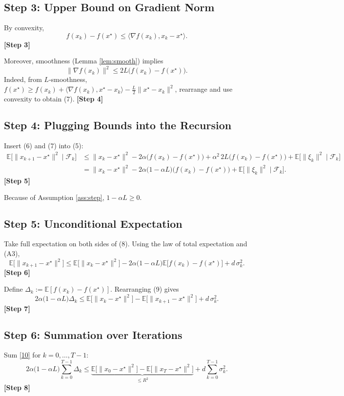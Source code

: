 \documentclass[11pt]{article}
\begin{document}
\subsection*{Step 3: Upper Bound on Gradient Norm}
By convexity,
\[
f(x_k)-f(x^{\star})\le\langle\nabla f(x_k),x_k-x^{\star}\rangle .
\tag{6}
\]
\textbf{[Step 3]}

Moreover, smoothness (Lemma \ref{lem:smooth}) implies
\[
\|\nabla f(x_k)\|^{2}\le 2L\bigl(f(x_k)-f(x^{\star})\bigr) .
\tag{7}
\]
Indeed, from $L$‑smoothness,
$f(x^{\star})\ge f(x_k)+\langle\nabla f(x_k),x^{\star}-x_k\rangle
-\frac{L}{2}\|x^{\star}-x_k\|^{2}$,
rearrange and use convexity to obtain (7). \textbf{[Step 4]}

\subsection*{Step 4: Plugging Bounds into the Recursion}
Insert (6) and (7) into (5):
\[
\begin{aligned}
\mathbb{E}\!\bigl[\|x_{k+1}-x^{\star}\|^{2}\mid\mathcal{F}_k\bigr]
&\le \|x_k-x^{\star}\|^{2}
-2\alpha\bigl(f(x_k)-f(x^{\star})\bigr)
+ \alpha^{2}\,2L\bigl(f(x_k)-f(x^{\star})\bigr)
+ \mathbb{E}\!\bigl[\|\xi_k\|^{2}\mid\mathcal{F}_k\bigr] \\
&= \|x_k-x^{\star}\|^{2}
-2\alpha\bigl(1-\alpha L\bigr)\bigl(f(x_k)-f(x^{\star})\bigr)
+ \mathbb{E}\!\bigl[\|\xi_k\|^{2}\mid\mathcal{F}_k\bigr].
\end{aligned}
\tag{8}
\]
\textbf{[Step 5]}

Because of Assumption \ref{ass:step}, $1-\alpha L\ge 0$.  

\subsection*{Step 5: Unconditional Expectation}
Take full expectation on both sides of (8). Using the law of total expectation and (A3),
\[
\mathbb{E}\!\bigl[\|x_{k+1}-x^{\star}\|^{2}\bigr]
\le \mathbb{E}\!\bigl[\|x_k-x^{\star}\|^{2}\bigr]
-2\alpha\bigl(1-\alpha L\bigr)\mathbb{E}\!\bigl[f(x_k)-f(x^{\star})\bigr]
+ d\,\sigma_k^{2}.
\tag{9}
\]
\textbf{[Step 6]}

Define $\Delta_k:=\mathbb{E}[f(x_k)-f(x^{\star})]$. Rearranging (9) gives
\[
2\alpha\bigl(1-\alpha L\bigr)\Delta_k
\le \mathbb{E}\!\bigl[\|x_k-x^{\star}\|^{2}\bigr]
- \mathbb{E}\!\bigl[\|x_{k+1}-x^{\star}\|^{2}\bigr]
+ d\,\sigma_k^{2}.
\tag{10}
\]
\textbf{[Step 7]}

\subsection*{Step 6: Summation over Iterations}
Sum \eqref{10} for $k=0,\dots,T-1$:
\[
2\alpha\bigl(1-\alpha L\bigr)\sum_{k=0}^{T-1}\Delta_k
\le \underbrace{\mathbb{E}\!\bigl[\|x_0-x^{\star}\|^{2}\bigr]
- \mathbb{E}\!\bigl[\|x_T-x^{\star}\|^{2}\bigr]}_{\le R^{2}}
+ d\sum_{k=0}^{T-1}\sigma_k^{2}.
\tag{11}
\]
\textbf{[Step 8]}
\end{document}
